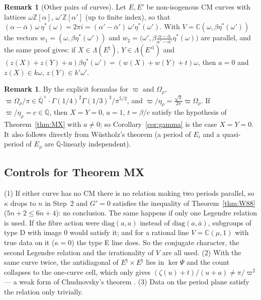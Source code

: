 \documentclass[11pt]{amsart}
\theoremstyle{definition}
\newtheorem{remark}[theorem]{Remark}
\newcommand{\Qb}{\overline{\mathbb{Q}}}
\newcommand{\C}{\mathbb{C}}
\newcommand{\Z}{\mathbb{Z}}
\newcommand{\vp}{\varpi}
\begin{document}
\begin{remark}[Other pairs of curves]\label{rem:general}
Let $E,E'$ be non-isogenous CM curves with lattices $\omega\Z[\alpha]$, $\omega'\Z[\alpha']$ (up to finite index), so that
$(\alpha-\bar\alpha)\,\omega\,\eta^*(\omega)=2\pi i=(\alpha'-\bar\alpha')\,\omega'\eta^*(\omega')$. With
$V=\C(\omega,\beta\eta^*(\omega'))$ the vectors $w_1=(\omega,\beta\eta^*(\omega'))$ and
$w_2=\bigl(\omega',\beta\frac{\alpha-\bar\alpha}{\alpha'-\bar\alpha'}\eta^*(\omega)\bigr)$ are parallel, and the same proof gives: if
$X\in\Lambda(E^\natural)$, $Y\in\Lambda(E'^\natural)$ and $(z(X)+z(Y)+a)\beta\eta^*(\omega')=(w(X)+w(Y)+t)\omega$, then $a=0$
and $z(X)\in k\omega$, $z(Y)\in k'\omega'$.
\end{remark}

\begin{remark}\label{rem:gamma}
By the explicit formulas for $\vp$ and $\Omega_\rho$, $\vp\Omega_\rho/\pi\in\Qb^\times\cdot\Gamma(1/4)^2\Gamma(1/3)^3/\pi^{5/2}$, and
$\vp/\eta_\rho=\tfrac{\sqrt3}{2\pi}\vp\Omega_\rho$. If $\vp/\eta_\rho=c\in\Qb$, then $X=Y=0$, $a=1$, $t=\beta/c$ satisfy the
hypothesis of Theorem~\ref{thm:MX} with $a\ne0$; so Corollary~\ref{cor:gamma} is the case $X=Y=0$. It also follows
directly from W\"ustholz's theorem \cite{Wu89} (a period of $E_i$ and a quasi-period of $E_\rho$ are $\Qb$-linearly
independent).
\end{remark}

\subsection{Controls for Theorem MX}
(1) If either curve has no CM there is no relation making two periods parallel, so $\kappa$ drops to $n$ in Step~2 and
$G'=0$ satisfies the inequality of Theorem~\ref{thm:W88} ($5n+2\le6n+4$): no conclusion. The same happens if only one
Legendre relation is used. If the fibre action were $\mathrm{diag}(a,a)$ instead of $\mathrm{diag}(a,\bar a)$, subgroups
of type D with image $0$ would satisfy it; and for a rational line $V=\C(\mu,1)$ with true data on it ($\kappa=0$) the
type E line does. So the conjugate character, the second Legendre relation and the irrationality of $V$ are all used. (2) With the same curve twice, the antidiagonal of $E^\natural\times E^\natural$ lies in $\ker\Psi$
and the count collapses to the one-curve cell, which only gives $(\zeta(u)+t)/(u+a)\neq\pi/\vp^2$ --- a weak form of
Chudnovsky's theorem \cite{Ch84}. (3) Data on the period plane satisfy the relation only trivially.
\end{document}
